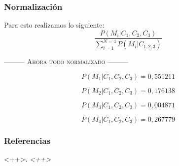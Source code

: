 \documentclass{beamer}
\begin{document}

\begin{frame}
\frametitle{Normalizaci\'on}
Para esto realizamos lo siguiente:
\begin{equation*}
\frac{P(M_{i}|C_{1}, C_{2}, C_{3})}{\sum_{i=1}^{N=4}P(M_{i}|C_{1, 2,
3})}
\end{equation*}

\begin{center}
\textsc{--------- Ahora todo normalizado ---------}
\end{center}
\begin{equation*}
P(M_{1}|C_{1}, C_{2}, C_{3}) = 0,551211
\end{equation*}

\begin{equation*}
P(M_{2}|C_{1}, C_{2}, C_{3}) = 0,176138
\end{equation*}

\begin{equation*}
P(M_{3}|C_{1}, C_{2}, C_{3}) = 0,004871
\end{equation*}

\begin{equation*}
P(M_{4}|C_{1}, C_{2}, C_{3}) = 0,267779
\end{equation*}
\end{frame}

\begin{frame}
\frametitle{Referencias}
\footnotesize{
	\begin{thebibliography}{99}
		\bibitem[<++>]{<++>} \textsc{<++>}. \textit{<++>}
		\newblock <++>
	\end{thebibliography}
}
\end{frame}

\end{document}
